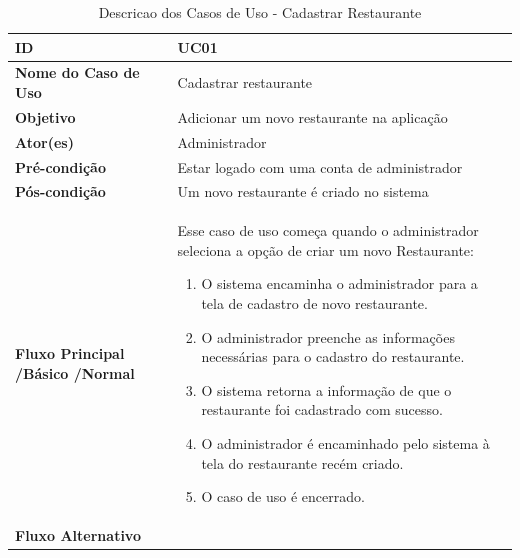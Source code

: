 \begin{table}[H]
\begin{tabular}{| p{6cm} | p{10cm} |}
	\hline
	\textbf{ID} & UC01\tabularnewline
	\hline
	\hline
	\textbf{Nome do Caso de Uso} & Cadastrar restaurante\tabularnewline
	\hline
	\textbf{Objetivo} & Adicionar um novo restaurante  na aplicação\tabularnewline
	\hline
	\textbf{Ator(es)} & Administrador\tabularnewline
	\hline
	\textbf{Pré-condição} & Estar logado com uma conta de administrador\tabularnewline
	\hline
	\textbf{Pós-condição} & Um novo restaurante é criado no sistema\tabularnewline
	\hline
	\textbf{Fluxo Principal /Básico /Normal} & Esse caso de uso começa quando o administrador seleciona a opção de criar um novo Restaurante:
	\begin{enumerate}
		\item O sistema encaminha o administrador para a tela de cadastro de novo restaurante.
		\item O administrador preenche as informações necessárias para o cadastro do restaurante.
		\item O sistema retorna a informação de que o restaurante foi cadastrado com sucesso.
		\item O administrador é encaminhado pelo sistema à tela do restaurante recém criado.
		\item O caso de uso é encerrado.
	\end{enumerate} \tabularnewline
	\hline
	\textbf{Fluxo Alternativo} & \tabularnewline
	\hline
\end{tabular}
\caption{Descricao dos Casos de Uso - Cadastrar Restaurante}
\label{DCU_Cadastrar_Restaurante}
\end{table}


